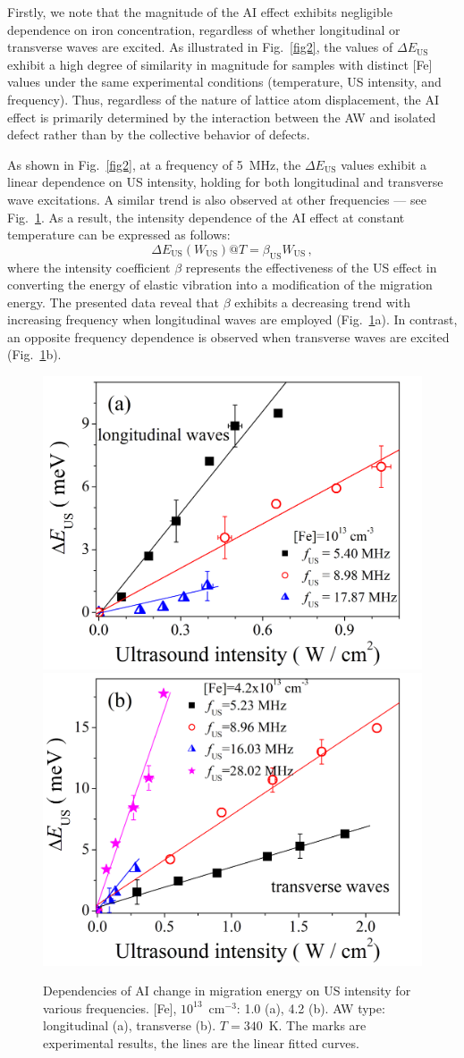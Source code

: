 \documentclass{ttp}
\begin{document}
Firstly, we note that the magnitude of the AI effect exhibits negligible dependence
on iron concentration, regardless of whether longitudinal or transverse waves are excited.
As illustrated in Fig.~\ref{fig2}, the values of $\Delta E_\mathrm{US}$ exhibit a high degree of similarity
in magnitude for samples with distinct [Fe] values under the same experimental conditions
(temperature, US intensity, and frequency).
Thus, regardless of the nature of lattice atom displacement,
the AI effect is primarily determined by the interaction between the AW and isolated defect
rather than by the collective behavior of defects.



As shown in Fig.~\ref{fig2}, at a frequency of 5~MHz,
the $\Delta E_\mathrm{US}$ values exhibit a linear dependence on US intensity,
holding for both longitudinal and transverse wave excitations.
A similar trend is also observed at other frequencies --- see Fig.~\ref{fig3}.
As a result, the intensity dependence of the AI effect at constant temperature can be expressed as follows:
\begin{equation}\label{eq3O}
  \Delta E_\mathrm{US}(W_\mathrm{US})@ T = \beta_\mathrm{US} W_\mathrm{US}\,,
\end{equation}
where
the intensity coefficient $\beta$ represents the effectiveness of the US effect
in converting the energy of elastic vibration into a modification of the migration energy.
The presented data reveal that $\beta$ exhibits a decreasing trend
with increasing frequency when longitudinal waves are employed (Fig.~\ref{fig3}a).
In contrast, an opposite frequency dependence is observed when transverse waves are excited (Fig.~\ref{fig3}b).

\begin{figure}
	\centering
     \includegraphics[width=0.4\linewidth]{Fig3a.png}
     \includegraphics[width=0.4\linewidth]{Fig3b.png}
	  \caption{Dependencies of AI change in migration energy on US intensity
      for various frequencies.
       [Fe], $10^{13}$~cm$^{-3}$: 1.0 (a), 4.2 (b).
       AW type: longitudinal (a), transverse (b).
       $T=340$~K.
       The marks are experimental results,
       the lines are the linear fitted curves.
}\label{fig3}
\end{figure}
\end{document}
